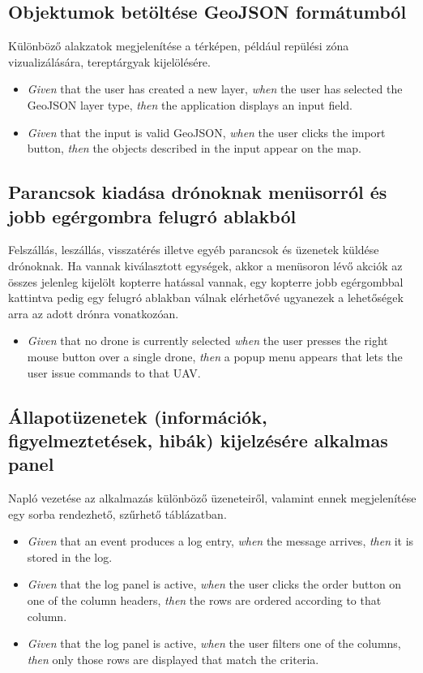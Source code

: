 \subsection{Objektumok betöltése GeoJSON formátumból}

Különböző alakzatok megjelenítése a térképen, például repülési zóna vizualizálására, tereptárgyak kijelölésére.

\begin {itemize}
  \item \textit{Given} that the user has created a new layer, \textit{when} the user has selected the GeoJSON layer type, \textit{then} the application displays an input field.
  \item \textit{Given} that the input is valid GeoJSON, \textit{when} the user clicks the import button, \textit{then} the objects described in the input appear on the map.
\end {itemize}


\subsection{Parancsok kiadása drónoknak menüsorról és jobb egérgombra felugró ablakból}

Felszállás, leszállás, visszatérés illetve egyéb parancsok és üzenetek küldése drónoknak. Ha vannak kiválasztott egységek, akkor a menüsoron lévő akciók az összes jelenleg kijelölt kopterre hatással vannak, egy kopterre jobb egérgombbal kattintva pedig egy felugró ablakban válnak elérhetővé ugyanezek a lehetőségek arra az adott drónra vonatkozóan.

\begin {itemize}
  \item \textit{Given} that no drone is currently selected \textit{when} the user presses the right mouse button over a single drone, \textit{then} a popup menu appears that lets the user issue commands to that UAV.
\end {itemize}


\subsection{Állapotüzenetek (információk, figyelmeztetések, hibák) kijelzésére alkalmas panel}

Napló vezetése az alkalmazás különböző üzeneteiről, valamint ennek megjelenítése egy sorba rendezhető, szűrhető táblázatban.

\begin {itemize}
  \item \textit{Given} that an event produces a log entry, \textit{when} the message arrives, \textit{then} it is stored in the log.
  \item \textit{Given} that the log panel is active, \textit{when} the user clicks the order button on one of the column headers, \textit{then} the rows are ordered according to that column.
  \item \textit{Given} that the log panel is active, \textit{when} the user filters one of the columns, \textit{then} only those rows are displayed that match the criteria.
\end {itemize}


